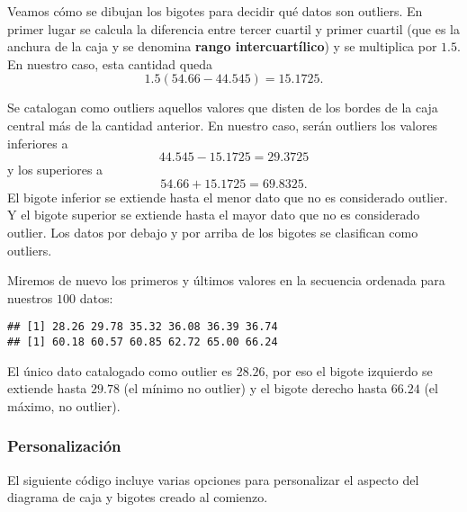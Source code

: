 \documentclass[
  degree=mecinf,
  title=normal,
  toc=normal,
  bib=normal]{mnye}
\newenvironment{Shaded}{\begin{snugshade}}{\end{snugshade}}
\newcommand{\FunctionTok}[1]{\textcolor[rgb]{0.00,0.00,0.00}{#1}}
\newcommand{\NormalTok}[1]{#1}
\newcommand{\OtherTok}[1]{\textcolor[rgb]{0.56,0.35,0.01}{#1}}
\newcommand{\SpecialCharTok}[1]{\textcolor[rgb]{0.00,0.00,0.00}{#1}}
\begin{document}
Veamos cómo se dibujan los bigotes para decidir qué datos son outliers.
En primer lugar se calcula la diferencia entre tercer cuartil y primer cuartil (que es la anchura de la caja y se denomina \textbf{rango intercuartílico}) y se multiplica por \(1.5\). En nuestro caso, esta cantidad queda
\[
    1.5(54.66-44.545)=15.1725.
\]

Se catalogan como outliers aquellos valores que disten de los bordes de la caja central más de la cantidad anterior. En nuestro caso, serán outliers los valores inferiores a
\[
    44.545-15.1725=29.3725
\]
y los superiores a
\[
    54.66+15.1725=69.8325.
\]
El bigote inferior se extiende hasta el menor dato que no es considerado outlier. Y el bigote superior se extiende hasta el mayor dato que no es considerado outlier. Los datos por debajo y por arriba de los bigotes se clasifican como outliers.

Miremos de nuevo los primeros y últimos valores en la secuencia ordenada para nuestros \(100\) datos:

\begin{Shaded}
\end{Shaded}

\begin{verbatim}
## [1] 28.26 29.78 35.32 36.08 36.39 36.74
## [1] 60.18 60.57 60.85 62.72 65.00 66.24
\end{verbatim}

El único dato catalogado como outlier es \(28.26\), por eso el bigote izquierdo se extiende hasta \(29.78\) (el mínimo no outlier) y el bigote derecho hasta \(66.24\) (el máximo, no outlier).

\hypertarget{personalizaciuxf3n}{%
\subsubsection{Personalización}\label{personalizaciuxf3n}}

El siguiente código incluye varias opciones para personalizar el aspecto del diagrama de caja y bigotes creado al comienzo.
\end{document}
